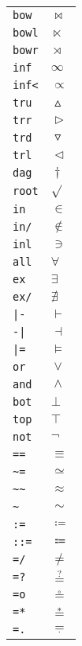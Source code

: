 \begin{longtable}{ll}
\texttt{bow}&${}\bowtie {}$\\
\texttt{bowl}&${}\ltimes {}$\\
\texttt{bowr}&${}\rtimes {}$\\
\texttt{inf}&${}\infty {}$\\
\texttt{inf<}&${}\propto {}$\\
\texttt{tru}&${}\vartriangle {}$\\
\texttt{trr}&${}\vartriangleright {}$\\
\texttt{trd}&${}\triangledown {}$\\
\texttt{trl}&${}\vartriangleleft {}$\\
\texttt{dag}&${}\dagger {}$\\
\texttt{root}&${}\sqrt {}$\\
\texttt{in}&${}\in {}$\\
\texttt{in/}&${}\notin {}$\\
\texttt{inl}&${}\ni {}$\\
\texttt{all}&${}\forall {}$\\
\texttt{ex}&${}\exists {}$\\
\texttt{ex/}&${}\nexists {}$\\
\texttt{|{-}}&${}\vdash {}$\\
\texttt{{-}|}&${}\dashv {}$\\
\texttt{|=}&${}\models {}$\\
\texttt{or}&${}\vee {}$\\
\texttt{and}&${}\wedge {}$\\
\texttt{bot}&${}\bot {}$\\
\texttt{top}&${}\top {}$\\
\texttt{not}&${}\neg {}$\\
\texttt{==}&${}\equiv {}$\\
\texttt{\textasciitilde =}&${}\simeq {}$\\
\texttt{\textasciitilde \textasciitilde }&${}\approx {}$\\
\texttt{\textasciitilde }&${}\sim {}$\\
\texttt{:=}&${}\coloneqq {}$\\
\texttt{::=}&${}\Coloneqq {}$\\
\texttt{=/}&${}\neq {}$\\
\texttt{=?}&${}\mathrel{\overset{?}{=}} {}$\\
\texttt{=o}&${}\mathrel{\overset{\circ}{=}} {}$\\
\texttt{=*}&${}\mathrel{\overset{*}{=}} {}$\\
\texttt{=.}&${}\mathrel{\underset{\cdotp}{=}} {}$\\

\end{longtable}
